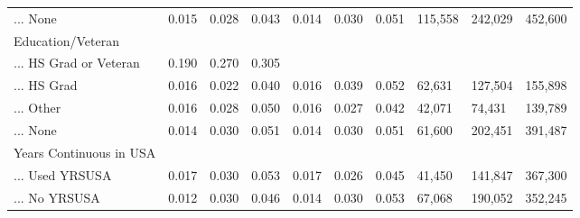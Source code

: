\documentclass[
  letterpaper,
  DIV=11,
  numbers=noendperiod]{scrartcl}
\begin{document}
\begin{table}[!htbp]
{\begin{tabular}{llllllllll}
... None & 0.015 & 0.028 & 0.043 & 0.014 & 0.030 & 0.051 & 115,558 & 242,029 & 452,600 \\ 
Education/Veteran &  &  &  &  &  &  &  &  &  \\ 
... HS Grad or Veteran & 0.190 & 0.270 & 0.305 &  &  &  &  &  &  \\ 
... HS Grad & 0.016 & 0.022 & 0.040 & 0.016 & 0.039 & 0.052 & 62,631 & 127,504 & 155,898 \\ 
... Other & 0.016 & 0.028 & 0.050 & 0.016 & 0.027 & 0.042 & 42,071 & 74,431 & 139,789 \\ 
... None & 0.014 & 0.030 & 0.051 & 0.014 & 0.030 & 0.051 & 61,600 & 202,451 & 391,487 \\ 
Years Continuous in USA &  &  &  &  &  &  &  &  &  \\ 
... Used YRSUSA & 0.017 & 0.030 & 0.053 & 0.017 & 0.026 & 0.045 & 41,450 & 141,847 & 367,300 \\ 
... No YRSUSA & 0.012 & 0.030 & 0.046 & 0.014 & 0.030 & 0.053 & 67,068 & 190,052 & 352,245\\ 
\hline
\hline
\end{tabular}
}
\end{table}
\end{document}
